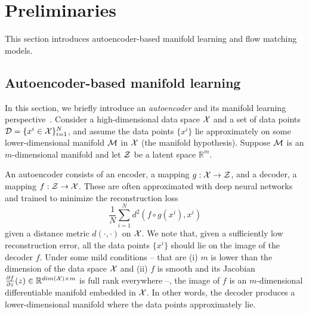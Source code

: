 \section{Preliminaries}
\label{sec:prelim}
This section introduces autoencoder-based manifold learning and flow matching models.

\subsection{Autoencoder-based manifold learning}
\label{sec:prelim-part1}
In this section, we briefly introduce an {\it autoencoder} and its manifold learning perspective~\cite{arvanitidis2017latent,lee2021neighborhood,lee2022statistical,yonghyeon2022regularized,janggeometrically,lee2023geometric,lee2023explicit,lim2024graph}. Consider a high-dimensional data space ${\cal X}$ and a set of data points ${\cal D}=\{x^i \in {\cal X}\}_{i=1}^{N}$, and assume the data points $\{x^i\}$ lie approximately on some lower-dimensional manifold ${\cal M}$ in ${\cal X}$ (the manifold hypothesis). 
Suppose ${\cal M}$ is an $m$-dimensional manifold and let ${\cal Z}$ be a latent space $\mathbb{R}^{m}$.

An autoencoder consists of an encoder, a mapping $g:{\cal X} \to {\cal Z}$, and a decoder, a mapping $f:{\cal Z} \to {\cal X}$. 
These are often approximated with deep neural networks and trained to minimize the reconstruction loss 
\begin{equation}
    \frac{1}{N}\sum_{i=1}^{N} d^2(f\circ g(x^i), x^i)
\end{equation}
given a distance metric $d(\cdot, \cdot)$ on ${\cal X}$. 
We note that, given a sufficiently low reconstruction error, all the data points $\{x^i\}$ should lie on the image of the decoder $f$. 
Under some mild conditions -- that are (i) $m$ is lower than the dimension of the data space ${\cal X}$ and (ii) $f$ is smooth and its Jacobian $\frac{\partial f}{\partial z}(z) \in \mathbb{R}^{dim({\cal X}) \times m}$ is full rank everywhere --, the image of $f$ is an $m$-dimensional differentiable manifold embedded in ${\cal X}$. 
In other words, the decoder produces a lower-dimensional manifold where the data points approximately lie.   

